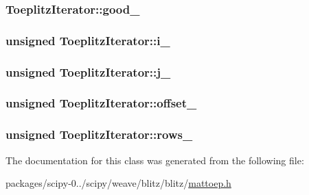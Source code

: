 \subsubsection[{good\+\_\+}]{ Toeplitz\+Iterator\+::good\+\_\+\hspace{0.3cm}{\ttfamily [protected]}}\label{classToeplitzIterator_afe73d7874f9af9ba2b78399a51c6d5ad}
\hypertarget{classToeplitzIterator_a3c3e35c4e0163b9dbd6c3d8b0e318c77}{}
\subsubsection[{i\+\_\+}]{\setlength{\rightskip}{0pt plus 5cm}unsigned Toeplitz\+Iterator\+::i\+\_\+\hspace{0.3cm}{\ttfamily [protected]}}\label{classToeplitzIterator_a3c3e35c4e0163b9dbd6c3d8b0e318c77}
\hypertarget{classToeplitzIterator_a88bdb00dbd25f207efca52fbb373c637}{}
\subsubsection[{j\+\_\+}]{\setlength{\rightskip}{0pt plus 5cm}unsigned Toeplitz\+Iterator\+::j\+\_\+\hspace{0.3cm}{\ttfamily [protected]}}\label{classToeplitzIterator_a88bdb00dbd25f207efca52fbb373c637}
\hypertarget{classToeplitzIterator_ad334e0b9de29ed027b35f5d096bb8e98}{}
\subsubsection[{offset\+\_\+}]{\setlength{\rightskip}{0pt plus 5cm}unsigned Toeplitz\+Iterator\+::offset\+\_\+\hspace{0.3cm}{\ttfamily [protected]}}\label{classToeplitzIterator_ad334e0b9de29ed027b35f5d096bb8e98}
\hypertarget{classToeplitzIterator_acc1568fc4b29f056d4e59176e351c790}{}
\subsubsection[{rows\+\_\+}]{\setlength{\rightskip}{0pt plus 5cm}unsigned Toeplitz\+Iterator\+::rows\+\_\+\hspace{0.3cm}{\ttfamily [protected]}}\label{classToeplitzIterator_acc1568fc4b29f056d4e59176e351c790}


The documentation for this class was generated from the following file\+:\begin{DoxyCompactItemize}
\item 
packages/scipy-\/0../scipy/weave/blitz/blitz/\hyperlink{mattoep_8h}{mattoep.\+h}\end{DoxyCompactItemize}
